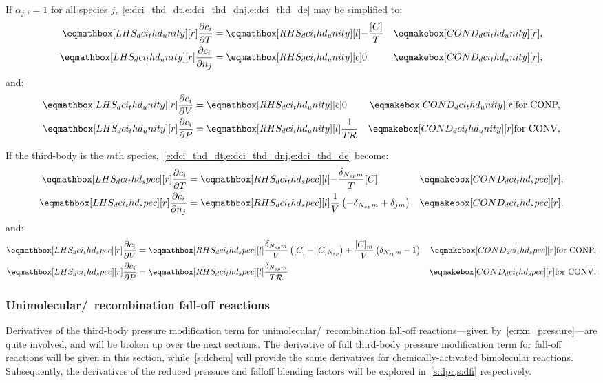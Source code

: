 \documentclass[12pt]{article}
\newcommand{\ns}{N_{sp}}
\newcommand{\conp}{CONP}
\newcommand{\conv}{CONV}
\newcommand{\dconp}{\ifmmode\text{for \conp,}\else for \conp,\fi}
\newcommand{\dconv}{\ifmmode\text{for \conv,}\else for \conv.\fi}
\newcommand{\Ru}{\mathcal{R}}
\begin{document}
If $\alpha_{j,i} = 1$ for all species $j$,~\cref{e:dci_thd_dt,e:dci_thd_dnj,e:dci_thd_de} may be simplified to:
\begin{align}
 \lhs{dci_thd_unity}{\frac{\partial c_{i} }{\partial T }} &= \rhs{dci_thd_unity}{- \frac{[C]}{T}}& \cond{dci_thd_unity}{,} \label{e:dci_thd_unity_dt} \\
 \lhs{dci_thd_unity}{\frac{\partial c_{i} }{\partial n_{j} }} &= \rhs{dci_thd_unity}{0}[c] & \cond{dci_thd_unity}{,}
\end{align}
and:
\begin{subequations}
 \label{e:dci_thd_unity_de}
 \begin{align}
  \lhs{dci_thd_unity}{\frac{\partial c_{i} }{\partial V }} &= \rhs{dci_thd_unity}{0}[c] & \cond{dci_thd_unity}{\dconp} \\
  \lhs{dci_thd_unity}{\frac{\partial c_{i} }{\partial P }} &= \rhs{dci_thd_unity}{\frac{1}{T \Ru}}& \cond{dci_thd_unity}{\dconv}
 \end{align}
\end{subequations}

If the third-body is the $m$th species,~\cref{e:dci_thd_dt,e:dci_thd_dnj,e:dci_thd_de} become:
\begin{align}
 \lhs{dci_thd_spec}{\frac{\partial c_{i} }{\partial T }} &= \rhs{dci_thd_spec}{-\frac{\delta_{\ns m}}{T} [C]}&\cond{dci_thd_spec}{,} \label{e:dci_thd_spec_dt} \\
 \lhs{dci_thd_spec}{\frac{\partial c_{i} }{\partial n_j }} &= \rhs{dci_thd_spec}{\frac{1}{V} \left(- \delta_{\ns m} + \delta_{j m}\right)}&\cond{dci_thd_spec}{,} \label{e:dci_thd_spec_dnj} \\
\end{align}
and:
\begin{subequations}
\label{e:dci_thd_spec_de}
\begin{align}
\lhs{dci_thd_spec}{\frac{\partial c_{i} }{\partial V }} &= \rhs{dci_thd_spec}{\frac{\delta_{\ns m}}{V} \left([C] - [C]_{\ns}\right) + \frac{[C]_{m}}{V} \left(\delta_{\ns m} - 1\right)} & \cond{dci_thd_spec}{\dconp} \\
\lhs{dci_thd_spec}{\frac{\partial c_{i} }{\partial P }} &= \rhs{dci_thd_spec}{\frac{\delta_{\ns m}}{T \Ru}} & \cond{dci_thd_spec}{\dconv}
\end{align}
\end{subequations}

\subsubsection{Unimolecular\slash~recombination fall-off reactions}
\label{s:dfall}
Derivatives of the third-body pressure modification term for unimolecular\slash~recombination fall-off reactions---given by~\cref{e:rxn_pressure}---are quite involved, and will be broken up over the next sections.
The derivative of full third-body pressure modification term for fall-off reactions will be given in this section, while~\cref{s:dchem} will provide the same derivatives for chemically-activated bimolecular reactions.
Subsequently, the derivatives of the reduced pressure and falloff blending factors will be explored in~\cref{s:dpr,s:dfi} respectively.
\end{document}
